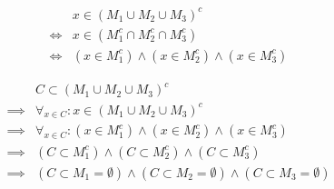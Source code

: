 \documentclass[10pt, a4paper, oneside]{article}
\begin{document}
\begin{enumerate}[(a)]
        \begin{fleqn}
            \begin{align*}
                     &x \in (M_1 \cup M_2 \cup M_3)^c \\
                \iff &x \in (M_1^c \cap M_2^c \cap M_3^c) \\
                \iff &(x \in M_1^c) \land (x \in M_2^c) \land (x \in M_3^c)
            \end{align*}
        \end{fleqn}

        \begin{fleqn}
            \begin{align*}
                         &C \subset (M_1 \cup M_2 \cup M_3)^c \\
                \implies &\forall_{x \in C} : x \in (M_1 \cup M_2 \cup M_3)^c \\
                \implies &\forall_{x \in C} : (x \in M_1^c) \land (x \in M_2^c) \land (x \in M_3^c) \\
                \implies &(C \subset M_1^c) \land (C \subset M_2^c) \land (C \subset M_3^c) \\
                \implies &(C \subset M_1 = \emptyset) \land (C \subset M_2 = \emptyset) \land (C \subset M_3 = \emptyset)
            \end{align*}
        \end{fleqn}
        
\end{enumerate}
\end{document}
